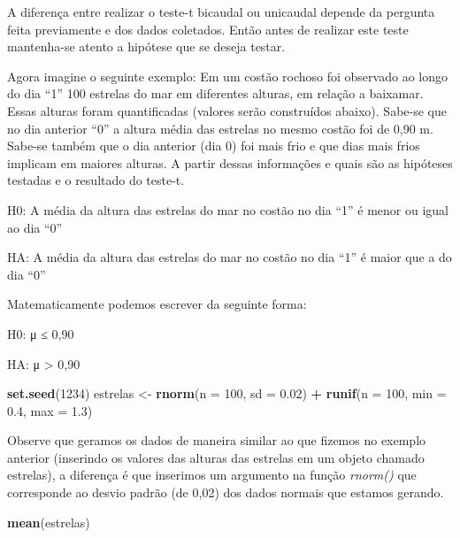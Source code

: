 \documentclass[titlepage, oneside, openany, a4paper]{book}
\newenvironment{Shaded}{\begin{snugshade}}{\end{snugshade}}
\newcommand{\DataTypeTok}[1]{\textcolor[rgb]{0.13,0.29,0.53}{#1}}
\newcommand{\DecValTok}[1]{\textcolor[rgb]{0.00,0.00,0.81}{#1}}
\newcommand{\FloatTok}[1]{\textcolor[rgb]{0.00,0.00,0.81}{#1}}
\newcommand{\KeywordTok}[1]{\textcolor[rgb]{0.13,0.29,0.53}{\textbf{#1}}}
\newcommand{\NormalTok}[1]{#1}
\newcommand{\OperatorTok}[1]{\textcolor[rgb]{0.81,0.36,0.00}{\textbf{#1}}}
\newcommand{\StringTok}[1]{\textcolor[rgb]{0.31,0.60,0.02}{#1}}
\begin{document}
A diferença entre realizar o teste-t bicaudal ou unicaudal depende da pergunta feita previamente e dos dados coletados. Então antes de realizar este teste mantenha-se atento a hipótese que se deseja testar.

Agora imagine o seguinte exemplo: Em um costão rochoso foi observado ao longo do dia ``1'' 100 estrelas do mar em diferentes alturas, em relação a baixamar. Essas alturas foram quantificadas (valores serão construídos abaixo). Sabe-se que no dia anterior ``0'' a altura média das estrelas no mesmo costão foi de 0,90 m. Sabe-se também que o dia anterior (dia 0) foi mais frio e que dias mais frios implicam em maiores alturas. A partir dessas informações e quais são as hipóteses testadas e o resultado do teste-t.

H0: A média da altura das estrelas do mar no costão no dia ``1'' é menor ou igual ao dia ``0''

HA: A média da altura das estrelas do mar no costão no dia ``1'' é maior que a do dia ``0''

Matematicamente podemos escrever da seguinte forma:

H0: μ ≤ 0,90

HA: μ \textgreater{} 0,90

\begin{Shaded}
\begin{Highlighting}[]
\KeywordTok{set.seed}\NormalTok{(}\DecValTok{1234}\NormalTok{)}
\NormalTok{estrelas <-}\StringTok{ }\KeywordTok{rnorm}\NormalTok{(}\DataTypeTok{n =} \DecValTok{100}\NormalTok{, }\DataTypeTok{sd =} \FloatTok{0.02}\NormalTok{) }\OperatorTok{+}\StringTok{ }\KeywordTok{runif}\NormalTok{(}\DataTypeTok{n =} \DecValTok{100}\NormalTok{, }\DataTypeTok{min =} \FloatTok{0.4}\NormalTok{, }\DataTypeTok{max =} \FloatTok{1.3}\NormalTok{)}
\end{Highlighting}
\end{Shaded}

Observe que geramos os dados de maneira similar ao que fizemos no exemplo anterior (inserindo os valores das alturas das estrelas em um objeto chamado estrelas), a diferença é que inserimos um argumento na função \emph{rnorm()} que corresponde ao desvio padrão (de 0,02) dos dados normais que estamos gerando.

\begin{Shaded}
\begin{Highlighting}[]
\KeywordTok{mean}\NormalTok{(estrelas)}
\end{Highlighting}
\end{Shaded}
\end{document}
